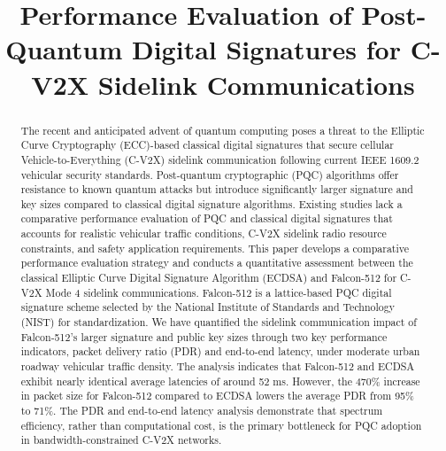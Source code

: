 \documentclass[conference]{IEEEtran}
\begin{document}
\title{Performance Evaluation of Post-Quantum Digital Signatures for C-V2X Sidelink Communications}




\maketitle

\begin{abstract}
The recent and anticipated advent of quantum computing poses a threat to the Elliptic Curve Cryptography (ECC)-based classical digital signatures that secure cellular Vehicle-to-Everything (C-V2X) sidelink communication following current IEEE 1609.2 vehicular security standards. Post-quantum cryptographic (PQC) algorithms offer resistance to known quantum attacks but introduce significantly larger signature and key sizes compared to classical digital signature algorithms. Existing studies lack a comparative performance evaluation of PQC and classical digital signatures that accounts for realistic vehicular traffic conditions, C-V2X sidelink radio resource constraints, and safety application requirements. This paper develops a comparative performance evaluation strategy and conducts a quantitative assessment between the classical Elliptic Curve Digital Signature Algorithm (ECDSA) and Falcon-512 for C-V2X Mode 4 sidelink communications. Falcon-512 is a lattice-based PQC digital signature scheme selected by the National Institute of Standards and Technology (NIST) for standardization. We have quantified the sidelink communication impact of Falcon-512's larger signature and public key sizes through two key performance indicators, packet delivery ratio (PDR) and end-to-end latency, under moderate urban roadway vehicular traffic density. The analysis indicates that Falcon-512 and ECDSA exhibit nearly identical average latencies of around 52 ms. However, the 470\% increase in packet size for Falcon-512 compared to ECDSA lowers the average PDR from 95\% to 71\%. The PDR and end-to-end latency analysis demonstrate that spectrum efficiency, rather than computational cost, is the primary bottleneck for PQC adoption in bandwidth-constrained C-V2X networks.
\end{abstract}
\end{document}
